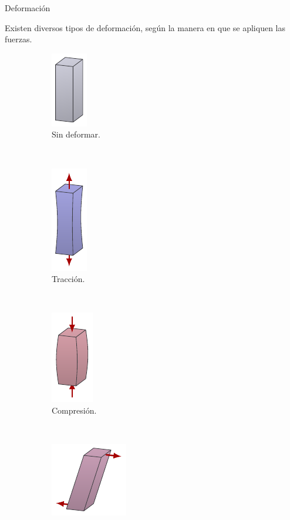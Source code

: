 \documentclass[11pt,handout,aspectratio=1610]{beamer}
\begin{document}
\begin{frame}{Deformación}

    Existen diversos tipos de deformación, según la manera en que se apliquen las fuerzas.

    \begin{figure}
        \centering
        \begin{subfigure}{0.3\textwidth}
            \centering
            \includegraphics{../figs/mechanics_stress-1.pdf}
            \caption{Sin deformar.}
        \end{subfigure}
        ~
        \begin{subfigure}{0.3\textwidth}
            \centering
            \includegraphics{../figs/mechanics_stress-2.pdf}
            \caption{Tracción.}
        \end{subfigure}
        ~
        \begin{subfigure}{0.3\textwidth}
            \centering
            \includegraphics{../figs/mechanics_stress-3.pdf}
            \caption{Compresión.}
        \end{subfigure} \\
        \begin{subfigure}{0.3\textwidth}
            \centering
            \includegraphics{../figs/mechanics_stress-6.pdf}

\end{subfigure}
\end{figure}
\end{frame}
\end{document}
